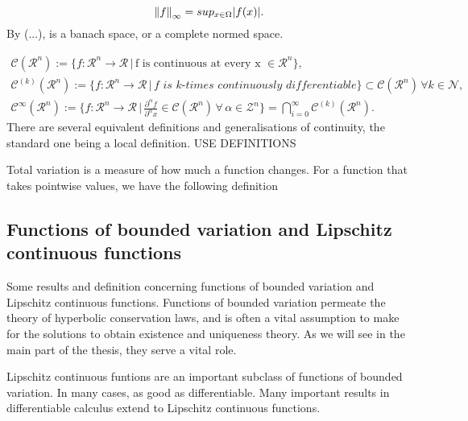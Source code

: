 \begin{equation}
    \left\lVert f\right\rVert_\infty = sup_{x \in \Omega} |f(x)|.
\end{equation}
By (...), is a banach space, or a complete normed space. 

\begin{align*}
    \mathscr{C}(\mathscr{R}^n) := \{f : \mathscr{R}^n \rightarrow \mathscr{R} \,|\, \text{f is continuous at every x $\in \mathscr{R}^n$}\}, \\
    \mathscr{C}^{(k)}(\mathscr{R}^n) := \{f : \mathscr{R}^n \rightarrow \mathscr{R} \,|\, \textit{f is $k$-times continuously differentiable}\} \subset \mathscr{C}(\mathscr{R}^n) \, \forall k \in \mathscr{N}, \\
    \mathscr{C}^{\infty}(\mathscr{R}^n) := \{f : \mathscr{R}^n \rightarrow \mathscr{R} \,|\, \frac{\partial^{\alpha} f}{\partial^{\alpha} x}\in \mathscr{C}(\mathscr{R}^n) \, \forall \, \alpha \in \mathscr{Z}^n\} = \bigcap_{i=0}^{\infty} \mathscr{C}^{(k)}(\mathscr{R}^n).
\end{align*}
There are several equivalent definitions and generalisations of continuity, the standard one being a local definition. 
USE DEFINITIONS 

Total variation is a measure of how much a function changes. For a function that takes pointwise values, we have the following definition

\subsection{Functions of bounded variation and Lipschitz continuous functions}
Some results and definition concerning functions of bounded variation and Lipschitz continuous functions. Functions of bounded variation permeate the theory of hyperbolic conservation laws, and is often a vital assumption to make for the solutions to obtain existence and uniqueness theory. As we will see in the main part of the thesis, they serve a vital role. 

Lipschitz continuous funtions are an important subclass of functions of bounded variation. In many cases, as good as differentiable. Many important results in differentiable calculus extend to Lipschitz continuous functions. 

